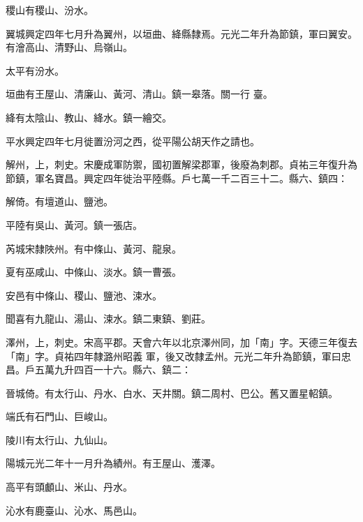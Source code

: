 \begin{pinyinscope}
 稷山有稷山、汾水。



 翼城興定四年七月升為翼州，以垣曲、絳縣隸焉。元光二年升為節鎮，軍曰翼安。有澮高山、清野山、烏嶺山。



 太平有汾水。



 垣曲有王屋山、清廉山、黃河、清山。鎮一皋落。關一行
 臺。



 絳有太陰山、教山、絳水。鎮一繪交。



 平水興定四年七月徙置汾河之西，從平陽公胡天作之請也。



 解州，上，刺史。宋慶成軍防禦，國初置解梁郡軍，後廢為刺郡。貞祐三年復升為節鎮，軍名寶昌。興定四年徙治平陸縣。戶七萬一千二百三十二。縣六、鎮四：



 解倚。有壇道山、鹽池。



 平陸有吳山、黃河。鎮一張店。



 芮城宋隸陜州。有中條山、黃河、龍泉。



 夏有巫咸山、中條山、淡水。鎮一曹張。



 安邑有中條山、稷山、鹽池、涑水。



 聞喜有九龍山、湯山、涑水。鎮二東鎮、劉莊。



 澤州，上，刺史。宋高平郡。天會六年以北京澤州同，加「南」字。天德三年復去「南」字。貞祐四年隸潞州昭義
 軍，後又改隸孟州。元光二年升為節鎮，軍曰忠昌。戶五萬九升四百一十六。縣六、鎮二：



 晉城倚。有太行山、丹水、白水、天井關。鎮二周村、巴公。舊又置星軺鎮。



 端氏有石門山、巨峻山。



 陵川有太行山、九仙山。



 陽城元光二年十一月升為績州。有王屋山、濩澤。



 高平有頭顱山、米山、丹水。



 沁水有鹿臺山、沁水、馬邑山。




\end{pinyinscope}
